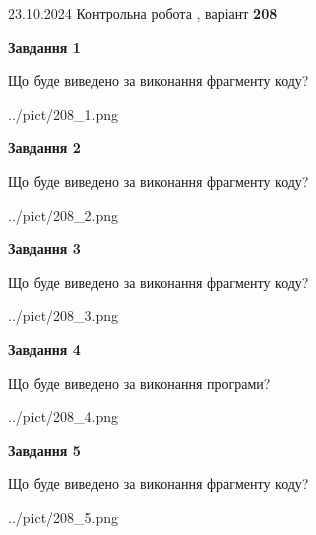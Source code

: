 \documentclass[12pt, ukrainian]{article}
\begin{document}
{\Large{23.10.2024 Контрольна робота , варіант  \No \textbf { 208 }\par}}
{
\begin {large}
{\begin {center}\textbf{Завдання 1}\end {center}}

Що буде виведено за виконання фрагменту коду?\par
\begin{center}
	{../pict/208_1.png}
\end{center}
\newpage

{\begin {center}\textbf{Завдання 2}\end {center}}

Що буде виведено за виконання фрагменту коду?\par
\begin{center}
	{../pict/208_2.png}
\end{center}
\newpage

{\begin {center}\textbf{Завдання 3}\end {center}}

Що буде виведено за виконання фрагменту коду?\par
\begin{center}
	{../pict/208_3.png}
\end{center}
\newpage

{\begin {center}\textbf{Завдання 4}\end {center}}

Що буде виведено за виконання програми?\par
\begin{center}
	{../pict/208_4.png}
\end{center}
\newpage

{\begin {center}\textbf{Завдання 5}\end {center}}

Що буде виведено за виконання фрагменту коду?\par
\begin{center}
	{../pict/208_5.png}
\end{center}
\newpage


\end{large}}
\end{document}
